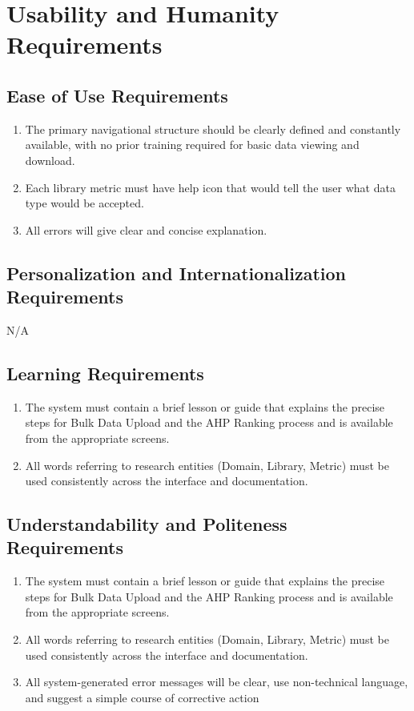 \documentclass[12pt]{article}
\begin{document}
\section{Usability and Humanity Requirements}
\subsection{Ease of Use Requirements}
\begin{enumerate}[label=\thesubsection-\arabic*]
  \item The primary navigational structure should be clearly defined and constantly available, with no prior training required for basic data viewing and download.
  \item Each library metric must have help icon that would tell the user what data type would be accepted.
  \item All errors will give clear and concise explanation.
\end{enumerate}
\subsection{Personalization and Internationalization Requirements}
N/A
\subsection{Learning Requirements}
\begin{enumerate}[label=\thesubsection-\arabic*]
  \item The system must contain a brief lesson or guide that explains the precise steps for Bulk Data Upload and the AHP Ranking process and is available from the appropriate screens.
  \item All words referring to research entities (Domain, Library, Metric) must be used consistently across the interface and documentation.
\end{enumerate}
\subsection{Understandability and Politeness Requirements}
\begin{enumerate}[label=\thesubsection-\arabic*]
  \item The system must contain a brief lesson or guide that explains the precise steps for Bulk Data Upload and the AHP Ranking process and is available from the appropriate screens.
  \item All words referring to research entities (Domain, Library, Metric) must be used consistently across the interface and documentation.
  \item All system-generated error messages will be clear, use non-technical language, and suggest a simple course of corrective action
\end{enumerate}
\end{document}
